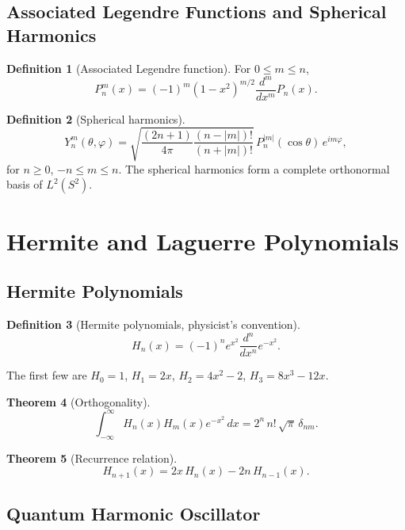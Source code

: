 \documentclass[12pt,a4paper]{amsart}
\newtheorem{theorem}{Theorem}[section]
\theoremstyle{definition}
\newtheorem{definition}[theorem]{Definition}
\begin{document}
\subsection{Associated Legendre Functions and Spherical Harmonics}

\begin{definition}[Associated Legendre function]
For \(0 \leq m \leq n\),
\[
  P_n^m(x) = (-1)^m(1-x^2)^{m/2}\frac{d^m}{dx^m}P_n(x).
\]
\end{definition}

\begin{definition}[Spherical harmonics]
\[
  Y_n^m(\theta,\varphi)
  = \sqrt{\frac{(2n+1)}{4\pi}\frac{(n-|m|)!}{(n+|m|)!}}\,
  P_n^{|m|}(\cos\theta)\,e^{im\varphi},
\]
for \(n \geq 0\), \(-n \leq m \leq n\).  The spherical harmonics form a complete
orthonormal basis of \(L^2(S^2)\).
\end{definition}

\section{Hermite and Laguerre Polynomials}
\label{sec:hermite_laguerre}

\subsection{Hermite Polynomials}

\begin{definition}[Hermite polynomials, physicist's convention]
\[
  H_n(x) = (-1)^n e^{x^2}\frac{d^n}{dx^n}e^{-x^2}.
\]
\end{definition}

The first few are \(H_0 = 1\), \(H_1 = 2x\), \(H_2 = 4x^2-2\), \(H_3 = 8x^3-12x\).

\begin{theorem}[Orthogonality]
\[
  \int_{-\infty}^\infty H_n(x)H_m(x)e^{-x^2}\,dx = 2^n\,n!\,\sqrt{\pi}\,\delta_{nm}.
\]
\end{theorem}

\begin{theorem}[Recurrence relation]
\[
  H_{n+1}(x) = 2x\,H_n(x) - 2n\,H_{n-1}(x).
\]
\end{theorem}

\subsection{Quantum Harmonic Oscillator}
\end{document}
